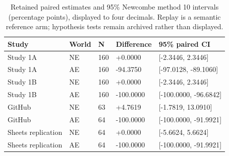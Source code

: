 \begin{table}[t]
\centering
\caption{Retained paired estimates and 95\% Newcombe method 10 intervals (percentage points), displayed to four decimals. Replay is a semantic reference arm; hypothesis tests remain archived rather than displayed.}
\label{tab:s-tests}
\begin{tabular}{@{}lllll@{}}
\toprule
Study & World & N & Difference & 95\% paired CI \\
\midrule
Study 1A & NE & 160 & +0.0000 & [-2.3446, 2.3446] \\
Study 1A & AE & 160 & -94.3750 & [-97.0128, -89.1060] \\
Study 1B & NE & 160 & +0.0000 & [-2.3446, 2.3446] \\
Study 1B & AE & 160 & -100.0000 & [-100.0000, -96.6842] \\
GitHub & NE & 63 & +4.7619 & [-1.7819, 13.0910] \\
GitHub & AE & 64 & -100.0000 & [-100.0000, -91.9921] \\
Sheets replication & NE & 64 & +0.0000 & [-5.6624, 5.6624] \\
Sheets replication & AE & 64 & -100.0000 & [-100.0000, -91.9921] \\
\bottomrule
\end{tabular}
\end{table}
